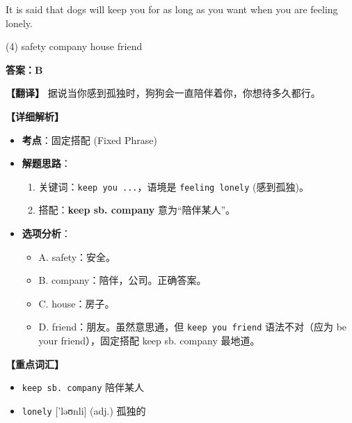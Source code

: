 \documentclass[11pt, a4paper]{article}
\newcommand{\analysis}[4]{
    \begin{solutionbox}
        \textbf{答案：#1}
        
        \textbf{【翻译】} #2
        
        \textbf{【详细解析】}
        #3
        
        \textbf{【重点词汇】}
        #4
    \end{solutionbox}
}
\newcommand{\blank}{\underline{\hspace{1.5cm}}}
\begin{document}
\begin{questions}
    \item It is said that dogs will keep you \blank for as long as you want when you are feeling lonely.
    \begin{tasks}(4)
        \task safety \task company \task house \task friend
    \end{tasks}
    \analysis{B}{据说当你感到孤独时，狗狗会一直陪伴着你，你想待多久都行。}{
        \begin{itemize}
            \item \textbf{考点}：固定搭配 (Fixed Phrase)
            \item \textbf{解题思路}：
                \begin{enumerate}
                    \item 关键词：\texttt{keep you ...}，语境是 \texttt{feeling lonely} (感到孤独)。
                    \item 搭配：\textbf{keep sb. company} 意为“陪伴某人”。
                \end{enumerate}
            \item \textbf{选项分析}：
                \begin{itemize}
                    \item A. safety：安全。
                    \item B. company：陪伴，公司。正确答案。
                    \item C. house：房子。
                    \item D. friend：朋友。虽然意思通，但 \texttt{keep you friend} 语法不对（应为 be your friend），固定搭配 keep sb. company 最地道。
                \end{itemize}
        \end{itemize}
    }{
        \begin{itemize}
            \item \texttt{keep sb. company} 陪伴某人
            \item \texttt{lonely} ['ləʊnli] (adj.) 孤独的
        \end{itemize}
    }


\end{questions}
\end{document}
